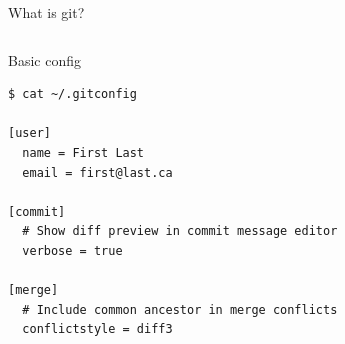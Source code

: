 \documentclass[xcolor=svgnames,17pt]{beamer}
\begin{document}
\begin{frame}{What is git?}
{\begin{columns}
\end{columns}
}
\end{frame}

\begin{frame}[fragile]{Basic config}
\begin{verbatim}
$ cat ~/.gitconfig

[user]
  name = First Last
  email = first@last.ca

[commit]
  # Show diff preview in commit message editor
  verbose = true

[merge]
  # Include common ancestor in merge conflicts
  conflictstyle = diff3

\end{verbatim}
\end{frame}
\end{document}
